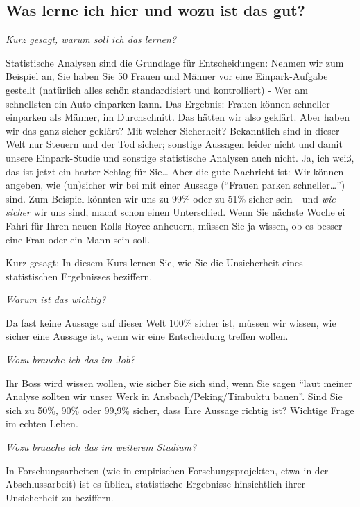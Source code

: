 \documentclass[
  ngerman,
  letterpaper,
]{scrbook}
\begin{document}
\subsection{Was lerne ich hier und wozu ist das
gut?}\label{was-lerne-ich-hier-und-wozu-ist-das-gut}

\emph{Kurz gesagt, warum soll ich das lernen?}

Statistische Analysen sind die Grundlage für Entscheidungen: Nehmen wir
zum Beispiel an, Sie haben Sie 50 Frauen und Männer vor eine
Einpark-Aufgabe gestellt (natürlich alles schön standardisiert und
kontrolliert) - Wer am schnellsten ein Auto einparken kann. Das
Ergebnis: Frauen können schneller einparken als Männer, im Durchschnitt.
Das hätten wir also geklärt. Aber haben wir das ganz sicher geklärt? Mit
welcher Sicherheit? Bekanntlich sind in dieser Welt nur Steuern und der
Tod sicher; sonstige Aussagen leider nicht und damit unsere
Einpark-Studie und sonstige statistische Analysen auch nicht. Ja, ich
weiß, das ist jetzt ein harter Schlag für Sie\ldots{} Aber die gute
Nachricht ist: Wir können angeben, wie (un)sicher wir bei mit einer
Aussage (\enquote{Frauen parken schneller\ldots{}}) sind. Zum Beispiel
könnten wir uns zu 99\% oder zu 51\% sicher sein - und \emph{wie sicher}
wir uns sind, macht schon einen Unterschied. Wenn Sie nächste Woche ei
Fahri für Ihren neuen Rolls Royce anheuern, müssen Sie ja wissen, ob es
besser eine Frau oder ein Mann sein soll.

Kurz gesagt: In diesem Kurs lernen Sie, wie Sie die Unsicherheit eines
statistischen Ergebnisses beziffern.

\emph{Warum ist das wichtig?}

Da fast keine Aussage auf dieser Welt 100\% sicher ist, müssen wir
wissen, wie sicher eine Aussage ist, wenn wir eine Entscheidung treffen
wollen.

\emph{Wozu brauche ich das im Job?}

Ihr Boss wird wissen wollen, wie sicher Sie sich sind, wenn Sie sagen
\enquote{laut meiner Analyse sollten wir unser Werk in
Ansbach/Peking/Timbuktu bauen}. Sind Sie sich zu 50\%, 90\% oder 99,9\%
sicher, dass Ihre Aussage richtig ist? Wichtige Frage im echten Leben.

\emph{Wozu brauche ich das im weiterem Studium?}

In Forschungsarbeiten (wie in empirischen Forschungsprojekten, etwa in
der Abschlussarbeit) ist es üblich, statistische Ergebnisse hinsichtlich
ihrer Unsicherheit zu beziffern.
\end{document}
